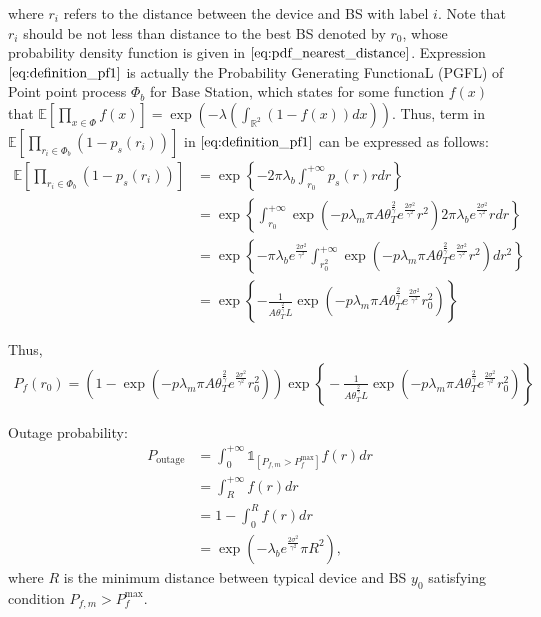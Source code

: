 where $r_i$ refers to the distance between the device and BS with label $i$. Note that $r_i$ should be not less than distance to the best BS denoted by $r_{0}$, whose probability density function is given in $\eqref{eq:pdf_nearest_distance}$. Expression $\eqref{eq:definition_pf1}$ is actually the Probability Generating FunctionaL (PGFL) of Point point process $\Phi_{b}$ for Base Station, which states for some function $f(x)$ that $\mathbb{E}\left[ \prod_{x \in \Phi}f(x) \right] = \exp(-\lambda(\int_{\mathbb{R}^2}(1-f(x))dx))$. Thus, term in $\mathbb{E} \left[  \prod_{r_i \in \Phi_{b}} (1-p_{s}(r_i)) \right]$ in $\eqref{eq:definition_pf1}$ can be expressed as follows:
\begin{align}
\mathbb{E} \left[  \prod_{r_i \in \Phi_{b}} (1-p_{s}(r_i)) \right] &= \exp\left\lbrace -2\pi \lambda_{b} \int_{r_{0}}^{+\infty} p_{s}(r)rdr \right\rbrace \nonumber\\
&= \exp\left\lbrace  \int_{r_{0}}^{+\infty}  \exp(-p \lambda_{m} \pi A \theta_{T}^{\frac{2}{\gamma}} e^{\frac{2\sigma^2}{\gamma^2}}  r^2) 2 \pi \lambda_b e^{\frac{2\sigma^2}{\gamma^2}}  rdr  \right\rbrace \nonumber \\ 
&= \exp\left\lbrace -\pi \lambda_{b} e^{\frac{2\sigma^2}{\gamma^2}}  \int_{r_{0}^{2}}^{+\infty}  \exp(-p \lambda_{m} \pi A \theta_{T}^{\frac{2}{\gamma}} e^{\frac{2\sigma^2}{\gamma^2}}  r^2 ) dr^2  \right\rbrace \nonumber\\ 
&= \exp\left\lbrace -\frac{1}{ A \theta_{T}^{\frac{2}{\gamma}}  L }  \exp(-p \lambda_{m} \pi A \theta_{T}^{\frac{2}{\gamma}} e^{  \frac{2\sigma^2}{\gamma^2}  } r_{0}^2)  \right\rbrace
\end{align} 

Thus,
\begin{align}
P_{f}(r_{0}) = ( 1- \exp(-p \lambda_{m} \pi A \theta_{T}^{\frac{2}{\gamma}} e^{\frac{2\sigma^2}{\gamma^2}}  r_{0}^2 ) )\exp\left\lbrace \!\!\!-\frac{1}{ A \theta_{T}^{\frac{2}{\gamma}}  L }  \!\exp(-p \lambda_{m} \pi A \theta_{T}^{\frac{2}{\gamma}} e^{  \frac{2\sigma^2}{\gamma^2}  } r_{0}^2)  \!\!\!\right\rbrace
\end{align}


Outage probability:
\begin{align}
	P_{\text{outage}} &= \int_{0}^{+\infty} \mathds{1}_{\left[ P_{f, m} > P_{f}^{\text{max}}\right] }f(r) dr \nonumber \\
	&= \int_{R}^{+\infty} f(r) dr \nonumber \\
	&= 1 - \int_{ 0 }^{ R } f(r) dr \nonumber \\
	&=  \exp( -\lambda_b  e^{\frac{2\sigma^2}{\gamma^2}} \pi R^2 ),
\end{align}
where $R$ is the minimum distance between typical device and BS $y_0$ satisfying condition $P_{f, m} > P_{f}^{\text{max}}$.
